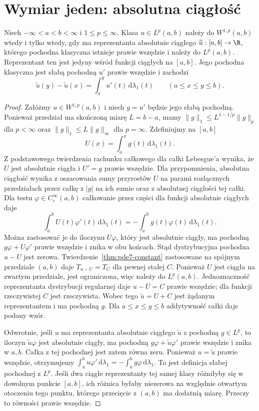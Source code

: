 \section{Wymiar jeden: absolutna ciągłość}
\label{sec:pde9-oneD}

\begin{twierdzenie}[Charakterystyka $W^{1,p}(a,b)$]
\label{thm:pde9-ac}
Niech $-\infty<a<b<\infty$ i $1\le p\le\infty$.
Klasa $u\in L^p(a,b)$ należy do $W^{1,p}(a,b)$ wtedy i tylko
wtedy, gdy ma reprezentanta absolutnie ciągłego
$\widetilde u:[a,b]\to\R$, którego pochodna klasyczna
istnieje prawie wszędzie i należy do $L^p(a,b)$.
Reprezentant ten jest jedyny wśród funkcji ciągłych na $[a,b]$.
Jego pochodna klasyczna jest słabą pochodną $u'$ prawie wszędzie
i zachodzi
\[
 \widetilde u(y)-\widetilde u(x)
 =\int_x^y u'(t)\,\mathrm d\lambda_1(t)
 \qquad(a\le x\le y\le b).
\]
\end{twierdzenie}
\begin{proof}
Załóżmy $u\in W^{1,p}(a,b)$ i niech $g=u'$ będzie jego
słabą pochodną. Ponieważ przedział ma skończoną miarę $L=b-a$,
mamy $\|g\|_1\le L^{1-1/p}\|g\|_p$ dla $p<\infty$
oraz $\|g\|_1\le L\|g\|_\infty$ dla $p=\infty$.
Zdefiniujmy na $[a,b]$
\[
 U(x)=\int_a^x g(t)\,\mathrm d\lambda_1(t).
\]
Z podstawowego twierdzenia rachunku całkowego dla całki
Lebesgue'a wynika, że $U$ jest absolutnie ciągła i
$U'=g$ prawie wszędzie. Dla przypomnienia, absolutna
ciągłość wynika z oszacowania sumy przyrostów $U$
na parami rozłącznych przedziałach przez całkę z $|g|$
na ich sumie oraz z absolutnej ciągłości tej całki.
Dla testu $\varphi\in C_c^\infty(a,b)$ całkowanie przez
części dla funkcji absolutnie ciągłych daje
\[
 \int_a^b U(t)\varphi'(t)\,\mathrm d\lambda_1(t)
 =-\int_a^b g(t)\varphi(t)\,\mathrm d\lambda_1(t).
\]
Można zastosować je do iloczynu $U\varphi$, który jest
absolutnie ciągły, ma pochodną $g\varphi+U\varphi'$
prawie wszędzie i znika w obu końcach.
Stąd dystrybucyjna pochodna $u-U$ jest zerowa.
Twierdzenie~\ref{thm:pde7-constant} zastosowane na spójnym
przedziale $(a,b)$ daje $T_{u-U}=T_C$ dla pewnej stałej $C$.
Ponieważ $U$ jest ciągła na zwartym przedziale,
jest ograniczona, więc należy do $L^p(a,b)$.
Jednoznaczność reprezentanta dystrybucji regularnej
daje $u-U=C$ prawie wszędzie; dla funkcji rzeczywistej $C$
jest rzeczywista. Wobec tego $\widetilde u=U+C$ jest
żądanym reprezentantem i ma pochodną $g$.
Dla $a\le x\le y\le b$ addytywność całki daje podany wzór.

Odwrotnie, jeśli $u$ ma reprezentanta absolutnie ciągłego
$\widetilde u$ z pochodną $g\in L^p$, to iloczyn
$\widetilde u\varphi$ jest absolutnie ciągły, ma pochodną
$g\varphi+\widetilde u\varphi'$ prawie wszędzie
i znika w $a,b$. Całka z tej pochodnej jest zatem równa zeru.
Ponieważ $u=\widetilde u$ prawie wszędzie,
otrzymujemy $\int_a^b u\varphi'\,\mathrm d\lambda_1
=-\int_a^b g\varphi\,\mathrm d\lambda_1$.
To jest definicja słabej pochodnej z $L^p$.
Jeśli dwa ciągłe reprezentanty tej samej klasy różniłyby się
w dowolnym punkcie $[a,b]$, ich różnica byłaby niezerowa
na względnie otwartym otoczeniu tego punktu, którego przecięcie
z $(a,b)$ ma dodatnią miarę. Przeczy to równości prawie wszędzie.
\end{proof}

